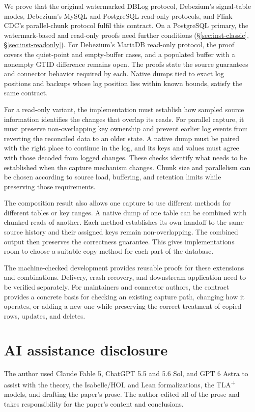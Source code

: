 \documentclass[sigconf,nonacm,10pt]{acmart}
\theoremstyle{plain}
\theoremstyle{definition}
\begin{document}
We prove that the original watermarked DBLog protocol, Debezium's signal-table 
modes, Debezium's MySQL and PostgreSQL read-only protocols, and Flink CDC's
parallel-chunk protocol fulfil this contract. On a PostgreSQL primary, the
watermark-based and read-only proofs need further conditions
(\S\ref{sec:inst-classic}, \S\ref{sec:inst-readonly}).
For Debezium's MariaDB read-only protocol, the proof covers 
the quiet-point and empty-buffer cases, and a populated buffer with a nonempty
GTID difference remains open. The proofs state the source
guarantees and connector behavior required by each. Native dumps tied to exact 
log positions and backups whose log position lies within known bounds, satisfy 
the same contract.

For a read-only variant, the implementation must establish how sampled source
information identifies the changes that overlap its reads. For parallel
capture, it must preserve non-overlapping key ownership and prevent earlier
log events from reverting the reconciled data to an older state. A native dump must be paired with
the right place to continue in the log, and its keys and values must agree
with those decoded from logged changes. These checks identify what needs to be
established when the capture mechanism changes. Chunk size and parallelism can
be chosen according to source load, buffering, and retention limits while
preserving those requirements.

The composition result also allows one capture to use different methods for
different tables or key ranges. A native dump of one table can be combined
with chunked reads of another. Each method establishes its own handoff to the
same source history and their assigned keys remain non-overlapping. The
combined output then preserves the correctness guarantee. This gives
implementations room to choose a suitable copy method for each part of the
database.

The machine-checked development provides reusable proofs for these extensions 
and combinations. Delivery, crash recovery, and downstream application need to 
be verified separately. For maintainers and connector
authors, the contract provides a concrete basis for checking an existing
capture path, changing how it operates, or adding a new one while preserving
the correct treatment of copied rows, updates, and deletes.

\section*{AI assistance disclosure}

The author used Claude Fable 5, ChatGPT 5.5 and 5.6 Sol, and GPT 6 Astra
to assist with the theory, the Isabelle/HOL and Lean formalizations, the
TLA\textsuperscript{+} models, and drafting the paper's prose. The author
edited all of the prose and takes responsibility for the paper's
content and conclusions.



\end{document}
